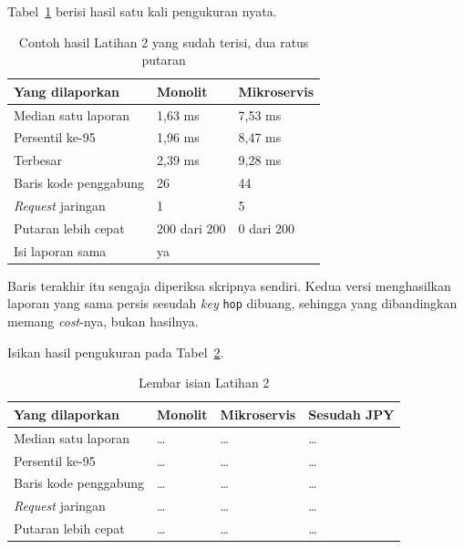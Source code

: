 Tabel~\ref{tab:lat2mikro-contoh} berisi hasil satu kali pengukuran nyata.

\begin{table}[htbp]
  \centering
  \caption{Contoh hasil Latihan 2 yang sudah terisi, dua ratus putaran}
  \label{tab:lat2mikro-contoh}
  \begin{tabularx}{\textwidth}{|X|l|l|}
    \hline
    \textbf{Yang dilaporkan} & \textbf{Monolit} & \textbf{Mikroservis} \\
    \hline
    Median satu laporan & 1,63 ms & 7,53 ms \\
    \hline
    Persentil ke-95 & 1,96 ms & 8,47 ms \\
    \hline
    Terbesar & 2,39 ms & 9,28 ms \\
    \hline
    Baris kode penggabung & 26 & 44 \\
    \hline
    \textit{Request} jaringan & 1 & 5 \\
    \hline
    Putaran lebih cepat & 200 dari 200 & 0 dari 200 \\
    \hline
    Isi laporan sama & \multicolumn{2}{l|}{ya} \\
    \hline
  \end{tabularx}
\end{table}

Baris terakhir itu sengaja diperiksa skripnya sendiri. Kedua versi menghasilkan
laporan yang sama persis sesudah \textit{key} \texttt{hop} dibuang, sehingga yang
dibandingkan memang \textit{cost}-nya, bukan hasilnya.

Isikan hasil pengukuran pada Tabel~\ref{tab:lat2mikro-hasil}.

\begin{table}[htbp]
  \centering
  \caption{Lembar isian Latihan 2}
  \label{tab:lat2mikro-hasil}
  \begin{tabularx}{\textwidth}{|X|l|l|l|}
    \hline
    \textbf{Yang dilaporkan} & \textbf{Monolit} & \textbf{Mikroservis} & \textbf{Sesudah JPY} \\
    \hline
    Median satu laporan & \dots & \dots & \dots \\
    \hline
    Persentil ke-95 & \dots & \dots & \dots \\
    \hline
    Baris kode penggabung & \dots & \dots & \dots \\
    \hline
    \textit{Request} jaringan & \dots & \dots & \dots \\
    \hline
    Putaran lebih cepat & \dots & \dots & \dots \\
    \hline
  \end{tabularx}
\end{table}


